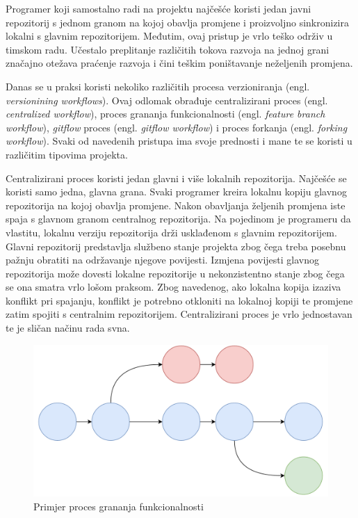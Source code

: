 \documentclass[times, utf8, diplomski, numeric]{fer}
\newcommand{\eng}[1]{(engl. \textit{#1})}
\begin{document}
Programer koji samostalno radi na projektu najčešće koristi jedan javni repozitorij s jednom granom na kojoj obavlja promjene i proizvoljno sinkronizira lokalni s glavnim repozitorijem. Međutim, ovaj pristup je vrlo teško održiv u timskom radu. Učestalo preplitanje različitih tokova razvoja na jednoj grani značajno otežava praćenje razvoja i čini teškim poništavanje neželjenih promjena.

Danas se u praksi koristi nekoliko različitih procesa verzioniranja \eng{versionining workflows}. Ovaj odlomak obrađuje centralizirani proces \eng{centralized workflow}, proces grananja funkcionalnosti \eng{feature branch workflow}, \textit{gitflow} proces \eng{gitflow workflow} i proces forkanja \eng{forking workflow}. Svaki od navedenih pristupa ima svoje prednosti i mane te se koristi u različitim tipovima projekta\citep{versioningWorkflows}.

Centralizirani proces koristi jedan glavni i više lokalnih repozitorija. Najčešće se koristi samo jedna, glavna grana. Svaki programer kreira lokalnu kopiju glavnog repozitorija na kojoj obavlja promjene. Nakon obavljanja željenih promjena iste spaja s glavnom granom centralnog repozitorija. Na pojedinom je programeru da vlastitu, lokalnu verziju repozitorija drži usklađenom s glavnim repozitorijem. Glavni repozitorij predstavlja službeno stanje projekta zbog čega treba posebnu pažnju obratiti na održavanje njegove povijesti. Izmjena povijesti glavnog repozitorija može dovesti lokalne repozitorije u nekonzistentno stanje zbog čega se ona smatra vrlo lošom praksom. Zbog navedenog, ako lokalna kopija izaziva konflikt pri spajanju, konflikt je potrebno otkloniti na lokalnoj kopiji te promjene zatim spojiti s centralnim repozitorijem. Centralizirani proces je vrlo jednostavan te je sličan načinu rada svna.

\begin{figure}[b]
\centering
\includegraphics[scale=0.5]{FeatureBranch}
\caption{Primjer proces grananja funkcionalnosti}
\label{fig:FeatureBranch}
\end{figure}
\end{document}
